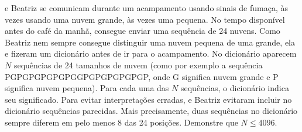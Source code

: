  e Beatriz se comunicam durante um acampamento usando sinais de fumaça, às vezes usando uma nuvem grande, às vezes uma pequena.
No tempo disponível antes do café da manhã,  consegue enviar uma sequência de 24 nuvens.
Como Beatriz nem sempre consegue distinguir uma nuvem pequena de uma grande, ela e  fizeram um dicionário antes de ir para o acampamento.
No dicionário aparecem $N$ sequências de 24 tamanhos de nuvem (como por exemplo a sequência PGPGPGPGPGPGGPGPGPGPGPGP, onde G significa nuvem grande e P significa nuvem pequena).
Para cada uma das $N$ sequências, o dicionário indica seu significado.
Para evitar interpretações erradas,  e Beatriz evitaram incluir no dicionário sequências parecidas.
Mais precisamente, duas sequências no dicionário sempre diferem em pelo menos 8 das 24 posições.
Demonstre que $N \le 4096$.